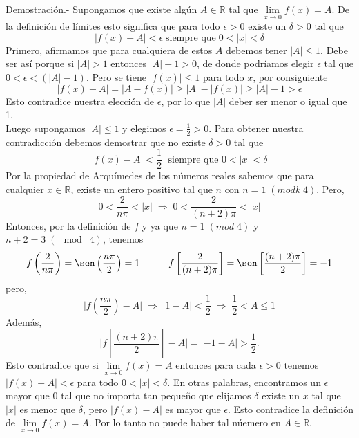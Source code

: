 \begin{enumerate}[\bfseries 1.]
	    Demostración.-\; Supongamos que existe algún $A\in \mathbb{R}$ tal que $\lim\limits_{x\to 0}f(x)=A.$ De la definición de límites esto significa que para todo $\epsilon>0$ existe un $\delta>0$ tal que 
	    $$|f(x)-A|<\epsilon\; \mbox{siempre que}\; 0<|x|<\delta$$
	    Primero, afirmamos que para cualquiera de estos $A$ debemos tener $|A|\leq 1$. Debe ser así porque si $|A|>1$ entonces $|A|-1>0$, de donde podríamos elegir $\epsilon$ tal que $0<\epsilon<(|A|-1)$. Pero se tiene $|f(x)|\leq 1$ para todo $x$, por consiguiente
	    $$|f(x)-A|=|A-f(x)|\geq |A|-|f(x)|\geq |A|-1>\epsilon$$
	    Esto contradice nuestra elección de $\epsilon$, por lo que $|A|$ deber ser menor o igual que 1.\\
	    Luego supongamos $|A|\leq 1$ y elegimos $\epsilon=\frac{1}{2}>0$. Para obtener nuestra contradicción debemos demostrar que no existe $\delta > 0$ tal que
	    $$|f(x)-A|<\dfrac{1}{2}\; \mbox{ siempre que } 0<|x|<\delta$$
	    Por la propiedad de Arquímedes de los números reales sabemos que para cualquier $x\in \mathbb{R}$, existe un entero positivo tal que $n$ con $n=1\; (modk\; 4)$. Pero,
	    $$0<\dfrac{2}{n\pi}<|x|\; \Longrightarrow \; 0<\dfrac{2}{(n+2)\pi}<|x|$$
	    Entonces, por la definición de $f$ y ya que $n=1\; (mod \;4)$ y $n+2=3\; (\mod\; 4)$, tenemos 
	    $$f\left(\dfrac{2}{n\pi}\right)=\sen\left(\dfrac{n\pi}{2}\right)=1 \qquad \quad f\left[\dfrac{2}{(n+2)\pi}\right]=\sen\left[\dfrac{(n+2)\pi}{2}\right]=-1$$
	    pero,
	    $$\bigg|f\left(\dfrac{n\pi}{2}\right)-A\bigg|\; \Longrightarrow \; |1-A|<\dfrac{1}{2} \; \Longrightarrow\; \dfrac{1}{2}<A\leq 1$$
	    Además,
	    $$\bigg|f\left[\dfrac{(n+2)\pi}{2}\right]-A\bigg|=|-1-A|>\dfrac{1}{2}.$$
	    Esto contradice que si $\lim\limits_{x\to 0}f(x)=A$ entonces para cada $\epsilon>0$ tenemos $|f(x)-A|<\epsilon$ para todo $0<|x|<\delta$. En otras palabras, encontramos un $\epsilon$ mayor que $0$ tal que no importa tan pequeño que elijamos $\delta$ existe un $x$ tal que $|x|$ es menor que $\delta$, pero $|f(x)-A|$ es mayor que $\epsilon$. Esto contradice la definición de $\lim\limits_{x\to 0}f(x)=A$. Por lo tanto no puede haber tal núemero en $A\in \mathbb{R}$.\\\\


\end{enumerate}
